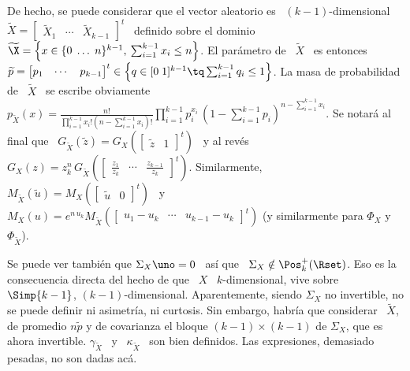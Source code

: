 De hecho, se puede considerar que el vector aleatorio es \ $(k-1)$-dimensional \
$\widetilde{X}     =    \begin{bmatrix}     \widetilde{X}_1    &     \cdots    &
  \widetilde{X}_{k-1}   \end{bmatrix}^t$   \  definido   sobre   el  dominio   \
$\widetilde{\X} = \left\{ x \in \{ 0 \; \ldots \; n\}^{k-1}, \: \sum_{i=1}^{k-1}
  x_i  \le n  \right\}$. El  par\'ametro de  \ $\widetilde{X}$  \ es  entonces \
$\widetilde{p}     =     \protect\begin{bmatrix}      p_1     &     \cdots     &
  p_{k-1}  \end{bmatrix}^t\protect  \in  \left\{   q  \in  [0  \;  1]^{k-1}  \tq
  \sum_{i=1}^{k-1}  q_i  \le  1  \right\}$.    La  masa  de  probabilidad  de  \
$\widetilde{X}$   \   se    escribe   obviamente   \   $p_{\widetilde{X}}(x)   =
\frac{n!}{\prod_{i=1}^{k-1} x_i!   (n-\sum_{i=1}^{k-1} x_i)!}  \prod_{i=1}^{k-1}
p_i^{x_i} \, \left( 1  - \sum_{i=1}^{k-1} p_i \right)^{n-\sum_{i=1}^{k-1} x_i}$.
Se  notar\'a al  final que  \ $G_{\widetilde{X}}\left(  \widetilde{z}  \right) =
G_X\left(  \begin{bmatrix} \widetilde{z}  & 1  \end{bmatrix}^t \right)$  \  y al
rev\'es   \   $G_X(z)  =   z_k^n   \,  G_{\widetilde{X}}\left(   \begin{bmatrix}
    \frac{z_1}{z_k}  & \cdots  &  \frac{z_{k-1}}{z_k} \end{bmatrix}^t  \right)$.
Similarmente,    \     $M_{\widetilde{X}}\left(    \widetilde{u}    \right)    =
M_X\left(  \begin{bmatrix} \widetilde{u}  &  0 \end{bmatrix}^t  \right)$  \ y  \
$M_X(u)  = e^{n  \, u_k}  M_{\widetilde{X}}\left(  \begin{bmatrix} u_1  - u_k  &
    \cdots  &  u_{k-1}  -  u_k  \end{bmatrix}^t \right)$  (y  similarmente  para
$\Phi_X$ y $\Phi_{\widetilde{X}}$).

Se puede ver  tambi\'en que $\Sigma_X \uno  = 0$ \ as\'i que  \ $\Sigma_X \notin
\Pos_k^+(\Rset)$.   Eso  es la  consecuencia  directa  del hecho  de  que  \ $X$  \
$k$-dimensional, vive sobre  \ $\Simp{k-1}$, $(k-1)$-dimensional. Aparentemente,
siendo  $\Sigma_X$  no  invertible,  no  se  puede  definir  ni  asimetr\'ia,  ni
curtosis. Sin embargo, habr\'ia que considerar \ $\widetilde{X}$, de promedio $n
\widetilde{p}$ y de covarianza el bloque $(k-1) \times (k-1)$ de $\Sigma_X$, que es
ahora invertible. $\gamma_{\widetilde{X}}$ \  y \ $\kappa_{\widetilde{X}}$ \ son
bien definidos. Las expresiones, demasiado pesadas, no son dadas ac\'a.

